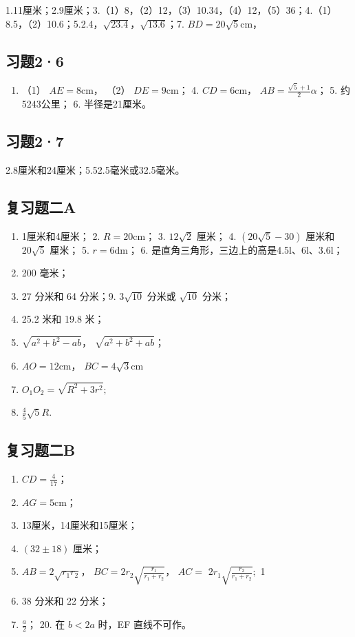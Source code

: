 1.11厘米；2.9厘米；3.（1）8，（2）12，（3）10.34，（4）12，（5）36；4.（1）8.5，（2）10.6；5.2.4，\(\sqrt{23.4}\)，\(\sqrt{13.6}\)；7.
\(BD = 20\sqrt{5}\mathrm{cm}\)，

\subsection{习题2·6}

\begin{enumerate}
\item
  （1） \(AE = 8\mathrm{cm}\)， （2） \(DE = 9\mathrm{cm}\)； 4.
  \(CD = 6\mathrm{cm}\)， \(AB = \frac{\sqrt{5} + 1}{2}\alpha\)； 5.
  约5243公里； 6. 半径是21厘米。
\end{enumerate}

\subsection{习题2·7}

2.8厘米和24厘米；5.52.5毫米或32.5毫米。

\subsection{复习题二A}

\begin{enumerate}
\item
  1厘米和4厘米； 2. \(R = 20\mathrm{cm}\)； 3. \(12\sqrt{2}\) 厘米； 4.
  \((20\sqrt{5} - 30)\) 厘米和 \(20\sqrt{5}\) 厘米； 5.
  \(r = 6\mathrm{dm}\)； 6. 是直角三角形，三边上的高是4.5l、6l、3.6l；
\item
  200 毫米；
\item
  27 分米和 64 分米；9. \(3\sqrt{10}\) 分米或 \(\sqrt{10}\) 分米；
\item
  25.2 米和 19.8 米；
\item
  \(\sqrt{a^2 + b^2 - ab}\)， \(\sqrt{a^2 + b^2 + ab}\)；
\item
  \(AO = 12\mathrm{cm}\)， \(BC = 4\sqrt{3}\mathrm{cm}\)
\item
  \(O_{1}O_{2} = \sqrt{R^{2} + 3r^{2}};\)
\item
  \(\frac{4}{5}\sqrt{5} R.\)
\end{enumerate}

\subsection{复习题二B}

\begin{enumerate}
\item
  \(CD = \frac{4}{17}\)；
\item
  \(AG = 5\mathrm{cm}\)；
\item
  13厘米，14厘米和15厘米；
\item
  \((32 \pm 18)\) 厘米；
\item
  \(AB = 2\sqrt{r_1r_2}\)， \(BC = 2r_2\sqrt{\frac{r_1}{r_1 + r_2}}\)，
  \(AC =\) \(2r_{1}\sqrt{\frac{r_{2}}{r_{1}+r_{2}}};\) 1
\item
  38 分米和 22 分米；
\item
  \(\frac{a}{2}\)； 20. 在 \(b < 2a\) 时，EF 直线不可作。
\end{enumerate}

